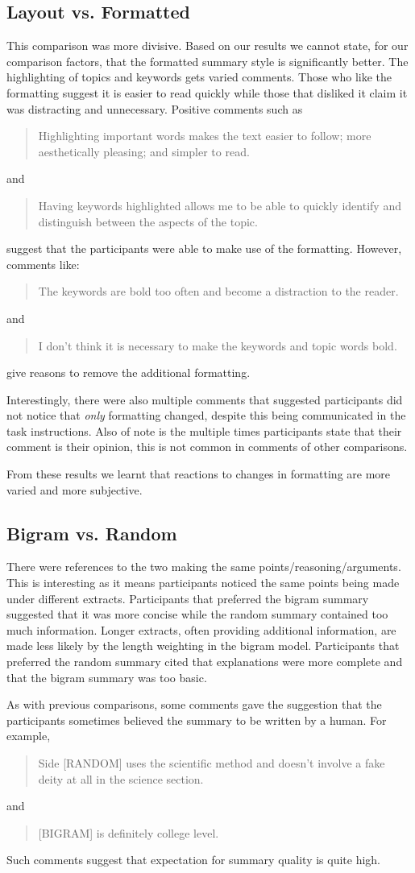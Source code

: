     \tocless\subsection{Layout vs. Formatted}
      This comparison was more divisive. Based on our results we cannot state, for our comparison factors, that the formatted summary style is significantly better. The highlighting of topics and keywords gets varied comments. Those who like the formatting suggest it is easier to read quickly while those that disliked it claim it was distracting and unnecessary. Positive comments such as \blockquote{Highlighting important words makes the text easier to follow; more aesthetically pleasing; and simpler to read.} and \blockquote{Having keywords highlighted allows me to be able to quickly identify and distinguish between the aspects of the topic.} suggest that the participants were able to make use of the formatting. However, comments like: \blockquote{The keywords are bold too often and become a distraction to the reader.} and \blockquote{I don't think it is necessary to make the keywords and topic words bold.} give reasons to remove the additional formatting.

      Interestingly, there were also multiple comments that suggested participants did not notice that \textit{only} formatting changed, despite this being communicated in the task instructions. Also of note is the multiple times participants state that their comment is their opinion, this is not common in comments of other comparisons.

      From these results we learnt that reactions to changes in formatting are more varied and more subjective.

    \tocless\subsection{Bigram vs. Random}
      There were references to the two making the same points/reasoning/arguments. This is interesting as it means participants noticed the same points being made under different extracts. Participants that preferred the bigram summary suggested that it was more concise while the random summary contained too much information. Longer extracts, often providing additional information, are made less likely by the length weighting in the bigram model. Participants that preferred the random summary cited that explanations were more complete and that the bigram summary was too basic.

      As with previous comparisons, some comments gave the suggestion that the participants sometimes believed the summary to be written by a human. For example, \blockquote{Side [RANDOM] uses the scientific method and doesn't involve a fake deity at all in the science section.} and \blockquote{[BIGRAM] is definitely college level.}. Such comments suggest that expectation for summary quality is quite high.

